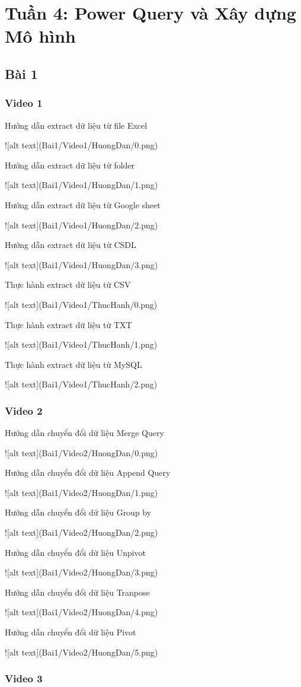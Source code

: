 \documentclass{article}
\begin{document}
\tableofcontents
\newpage
\listoffigures
\newpage
\section{Tuần 4: Power Query và Xây dựng Mô hình}
\subsection{Bài 1}
\subsubsection{Video 1}

\caption{Hướng dẫn extract dữ liệu từ file Excel}
![alt text](Bai1/Video1/HuongDan/0.png)
\caption{Hướng dẫn extract dữ liệu từ folder}
![alt text](Bai1/Video1/HuongDan/1.png)
\caption{Hướng dẫn extract dữ liệu từ Google sheet}
![alt text](Bai1/Video1/HuongDan/2.png)
\caption{Hướng dẫn extract dữ liệu từ CSDL}
![alt text](Bai1/Video1/HuongDan/3.png)

\caption{Thực hành extract dữ liệu từ CSV}
![alt text](Bai1/Video1/ThucHanh/0.png)
\caption{Thực hành extract dữ liệu từ TXT}
![alt text](Bai1/Video1/ThucHanh/1.png)
\caption{Thực hành extract dữ liệu từ MySQL}
![alt text](Bai1/Video1/ThucHanh/2.png)
\subsubsection{Video 2}

\caption{Hướng dẫn chuyển đổi dữ liệu Merge Query}
![alt text](Bai1/Video2/HuongDan/0.png)
\caption{Hướng dẫn chuyển đổi dữ liệu Append Query}
![alt text](Bai1/Video2/HuongDan/1.png)
\caption{Hướng dẫn chuyển đổi dữ liệu Group by}
![alt text](Bai1/Video2/HuongDan/2.png)
\caption{Hướng dẫn chuyển đổi dữ liệu Unpivot}
![alt text](Bai1/Video2/HuongDan/3.png)
\caption{Hướng dẫn chuyển đổi dữ liệu Tranpose}
![alt text](Bai1/Video2/HuongDan/4.png)
\caption{Hướng dẫn chuyển đổi dữ liệu Pivot}
![alt text](Bai1/Video2/HuongDan/5.png)
\subsubsection{Video 3}
\end{document}
